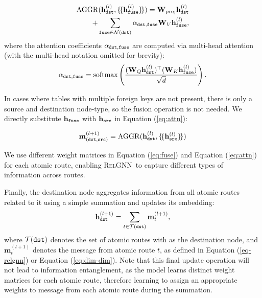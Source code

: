 \documentclass{article}
\newcommand{\method}{\textsc{RelGNN}}
\theoremstyle{plain}
\theoremstyle{definition}
\theoremstyle{remark}
\begin{document}
\begin{align}
\label{eq:attn}
    \operatorname{AGGR}(\mathbf{h}_{\texttt{dst}}^{(l)},\{\!\{\mathbf{h}_{\texttt{fuse}}^{(l)}\}\!\})= \mathbf{W}_{\operatorname{proj}}\mathbf{h}_{\texttt{dst}}^{(l)}\nonumber\\+\sum_{\texttt{fuse}\in \mathcal{N}(\texttt{dst})}\alpha_{\texttt{dst},\texttt{fuse}}\mathbf{W}_V\mathbf{h}_{\texttt{fuse}}^{(l)},
\end{align}
where the attention coefficients $\alpha_{\texttt{dst},\texttt{fuse}}$ are computed via multi-head attention (with the multi-head notation omitted for brevity):
\begin{equation*}
    \alpha_{\texttt{dst},\texttt{fuse}} = \textrm{softmax} \left(
        \frac{(\mathbf{W}_Q\mathbf{h}_{\texttt{dst}}^{(l)})^{\top} (\mathbf{W}_K\mathbf{h}_{\texttt{fuse}}^{(l)})}
        {\sqrt{d}} \right).
\end{equation*}

In cases where tables with multiple foreign keys are not present, there is only a source and destination node-type, so the fusion operation is not needed. We directly substitute $\mathbf{h}_{\texttt{fuse}}$  with $\mathbf{h}_{\texttt{src}}$  in Equation (\ref{eq:attn}):

\begin{equation}
    \label{eq:dim-dim}
      \mathbf{m}_{(\texttt{dst},\texttt{src})}^{(l+1)}=\operatorname{AGGR}(\mathbf{h}_{\texttt{dst}}^{(l)},\{\!\{\mathbf{h}_{\texttt{src}}^{(l)}  \}\!\})
\end{equation}

We use different weight matrices in Equation (\ref{eq:fuse})  and Equation (\ref{eq:attn}) for each atomic route, enabling \method~to capture different types of information across routes. 

Finally, the destination node aggregates information from all atomic routes related to it using a simple summation and updates its embedding:
\begin{equation}
    \mathbf{h}_{\texttt{dst}}^{(l+1)}=\sum_{t\in\mathcal{T}(\texttt{dst})}\mathbf{m}_t^{(l+1)},
\end{equation}
where $\mathcal{T}(\texttt{dst})$ denotes the set of atomic routes with \dst as the destination node, and $\mathbf{m}_t^{(l+1)}$ denotes the message from atomic route $t$, as defined in  Equation (\ref{eq-relgnn}) or Equation (\ref{eq:dim-dim}). Note that this final update operation will not lead to information entanglement, as the model learns distinct weight matrices for each atomic route, therefore learning to assign an appropriate weights to message from each atomic route during the summation.
\end{document}
